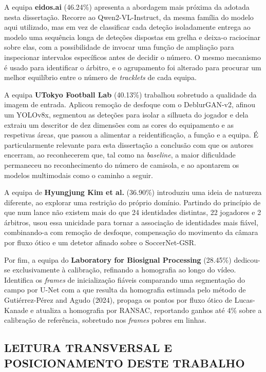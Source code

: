 A equipa \textbf{eidos.ai} (46.24\%) apresenta a abordagem mais próxima da adotada nesta
dissertação. Recorre ao Qwen2-VL-Instruct, da mesma família do modelo aqui utilizado, mas em
vez de classificar cada deteção isoladamente entrega ao modelo uma sequência longa de
deteções dispostas em grelha e deixa-o raciocinar sobre elas, com a possibilidade de invocar
uma função de ampliação para inspecionar intervalos específicos antes de decidir o número. O
mesmo mecanismo é usado para identificar o árbitro, e o agrupamento foi alterado para
procurar um melhor equilíbrio entre o número de \emph{tracklets} de cada equipa.

A equipa \textbf{UTokyo Football Lab} (40.13\%) trabalhou sobretudo a qualidade da imagem de
entrada. Aplicou remoção de desfoque com o DeblurGAN-v2, afinou um YOLOv8x, segmentou as
deteções para isolar a silhueta do jogador e dela extraiu um descritor de dez dimensões com
as cores do equipamento e as respetivas áreas, que passou a alimentar a reidentificação, a
função e a equipa. É particularmente relevante para esta dissertação a conclusão com que os
autores encerram, ao reconhecerem que, tal como na \emph{baseline}, a maior dificuldade
permaneceu no reconhecimento do número de camisola, e ao apontarem os modelos multimodais
como o caminho a seguir.

A equipa de \textbf{Hyungjung Kim et al.} (36.90\%) introduziu uma ideia de natureza
diferente, ao explorar uma restrição do próprio domínio. Partindo do princípio de que num
lance não existem mais do que 24 identidades distintas, 22 jogadores e 2 árbitros, usou essa
unicidade para tornar a associação de identidades mais fiável, combinando-a com remoção de
desfoque, compensação do movimento da câmara por fluxo ótico e um detetor afinado sobre o
SoccerNet-GSR.

Por fim, a equipa do \textbf{Laboratory for Biosignal Processing} (28.45\%) dedicou-se
exclusivamente à calibração, refinando a homografia ao longo do vídeo. Identifica os
\emph{frames} de inicialização fiáveis comparando uma segmentação do campo por U-Net com a
que resulta da homografia estimada pelo método de Gutiérrez-Pérez and Agudo (2024), propaga
os pontos por fluxo ótico de Lucas-Kanade e atualiza a homografia por RANSAC, reportando
ganhos até 4\% sobre a calibração de referência, sobretudo nos \emph{frames} pobres em
linhas.

\subsection{LEITURA TRANSVERSAL E POSICIONAMENTO DESTE TRABALHO}

